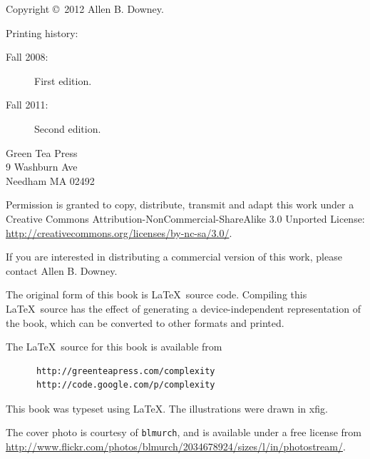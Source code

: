 \documentclass[10pt]{book}
\begin{document}
\begin{latexonly}
\pagebreak
\thispagestyle{empty}

{\small
Copyright \copyright ~2012 Allen B. Downey.


Printing history:

\begin{description}

\item[Fall 2008:] First edition.

\item[Fall 2011:] Second edition.

\end{description}

\vspace{0.2in}

\begin{flushleft}
Green Tea Press       \\
9 Washburn Ave \\
Needham MA 02492
\end{flushleft}

Permission is granted to copy, distribute, transmit and adapt
this work under a Creative Commons
Attribution-NonCommercial-ShareAlike 3.0 Unported License:
\url{http://creativecommons.org/licenses/by-nc-sa/3.0/}.

If you are interested in distributing a commercial version of this
work, please contact Allen B. Downey.

The original form of this book is \LaTeX\ source code.  Compiling this
\LaTeX\ source has the effect of generating a device-independent
representation of the book, which can be converted to other formats
and printed.

The \LaTeX\ source for this book is available from

\begin{verbatim}
      http://greenteapress.com/complexity
      http://code.google.com/p/complexity
\end{verbatim}

This book was typeset using \LaTeX .  The illustrations were
drawn in xfig.

The cover photo is courtesy of {\tt blmurch}, and is available
under a free license from
\url{http://www.flickr.com/photos/blmurch/2034678924/sizes/l/in/photostream/}.

\vspace{0.2in}

} %

\end{latexonly}
\end{document}

